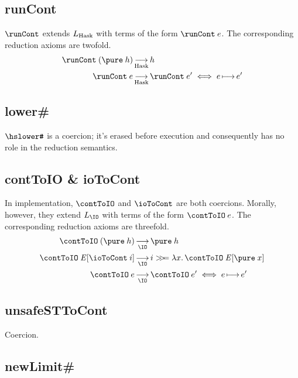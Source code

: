 \documentclass{report}
\begin{document}


\subsection{runCont} %

\( \runCont \) extends \( L_{\text{Hask}} \) with terms of the form \( \runCont \app e \).
The corresponding reduction axioms are twofold.
\begin{align*}
  \runCont \app (\pure \app h) &\redAx_\Hask h \\
  \runCont \app e &\redAx_\Hask \runCont \app e' \iff e \step e'
\end{align*}


\subsection{lower\#} %

\( \hslower\hash \) is a coercion; it's erased before execution and consequently has no role in the reduction semantics.


\subsection{contToIO \& ioToCont} %

In implementation, \( \contToIO \) and \( \ioToCont \) are both coercions.
Morally, however, they extend \( L_\IO \) with terms of the form \( \contToIO \app e \).
The corresponding reduction axioms are threefold.
\begin{align*}
  \contToIO \app (\pure \app h)
    &\redAx_\IO \pure \app h \\
  \contToIO \app {\E} \sq{\ioToCont \app i}
    &\redAx_\IO i \bind \lam x { \contToIO \app {{\E} \sq{\pure \app x}} } \\
  \contToIO \app e
    &\redAx_\IO \contToIO \app e' \iff e \step e'
\end{align*}


\subsection{unsafeSTToCont} %

Coercion.


\subsection{newLimit\#} %
\end{document}
